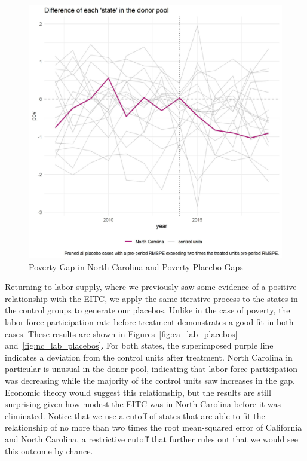 \documentclass{article}
\begin{document}
 \begin{figure}[H]
    \caption{Poverty Gap in North Carolina and Poverty Placebo Gaps}
    \begin{center}
        \includegraphics[width=.85\textwidth]{nc_pov_placebos}
    \end{center}
    \label{fig:nc_pov_placebos}{}
\end{figure}

Returning to labor supply, where we previously saw some evidence of a positive relationship with the EITC, we apply the same iterative process to the states in the control groups to generate our placebos. Unlike in the case of poverty, the labor force participation rate before treatment demonstrates a good fit in both cases. These results are shown in Figures~\ref{fig:ca_lab_placebos} and~\ref{fig:nc_lab_placebos}. For both states, the superimposed purple line indicates a deviation from the control units after treatment. North Carolina in particular is unusual in the donor pool, indicating that labor force participation was decreasing while the majority of the control units saw increases in the gap. Economic theory would suggest this relationship, but the results are still surprising given how modest the EITC was in North Carolina before it was eliminated. Notice that we use a cutoff of states that are able to fit the relationship of no more than two times the root mean-squared error of California and North Carolina, a restrictive cutoff that further rules out that we would see this outcome by chance.
\end{document}
